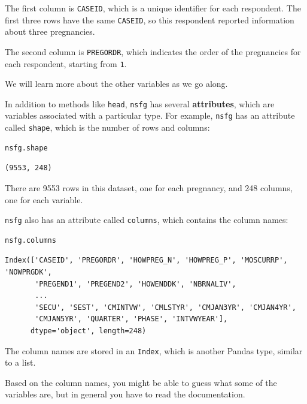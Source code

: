 The first column is \passthrough{\lstinline!CASEID!}, which is a unique
identifier for each respondent. The first three rows have the same
\passthrough{\lstinline!CASEID!}, so this respondent reported
information about three pregnancies.

The second column is \passthrough{\lstinline!PREGORDR!}, which indicates
the order of the pregnancies for each respondent, starting from
\passthrough{\lstinline!1!}.

We will learn more about the other variables as we go along.

In addition to methods like \passthrough{\lstinline!head!},
\passthrough{\lstinline!nsfg!} has several \textbf{attributes}, which
are variables associated with a particular type. For example,
\passthrough{\lstinline!nsfg!} has an attribute called
\passthrough{\lstinline!shape!}, which is the number of rows and
columns:

\begin{lstlisting}[language=Python,style=source]
nsfg.shape
\end{lstlisting}

\begin{lstlisting}[style=output]
(9553, 248)
\end{lstlisting}

There are 9553 rows in this dataset, one for each pregnancy, and 248
columns, one for each variable.

\passthrough{\lstinline!nsfg!} also has an attribute called
\passthrough{\lstinline!columns!}, which contains the column names:

\begin{lstlisting}[language=Python,style=source]
nsfg.columns
\end{lstlisting}

\begin{lstlisting}[style=output]
Index(['CASEID', 'PREGORDR', 'HOWPREG_N', 'HOWPREG_P', 'MOSCURRP', 'NOWPRGDK',
       'PREGEND1', 'PREGEND2', 'HOWENDDK', 'NBRNALIV',
       ...
       'SECU', 'SEST', 'CMINTVW', 'CMLSTYR', 'CMJAN3YR', 'CMJAN4YR',
       'CMJAN5YR', 'QUARTER', 'PHASE', 'INTVWYEAR'],
      dtype='object', length=248)
\end{lstlisting}

The column names are stored in an \passthrough{\lstinline!Index!}, which
is another Pandas type, similar to a list.

Based on the column names, you might be able to guess what some of the
variables are, but in general you have to read the documentation.

